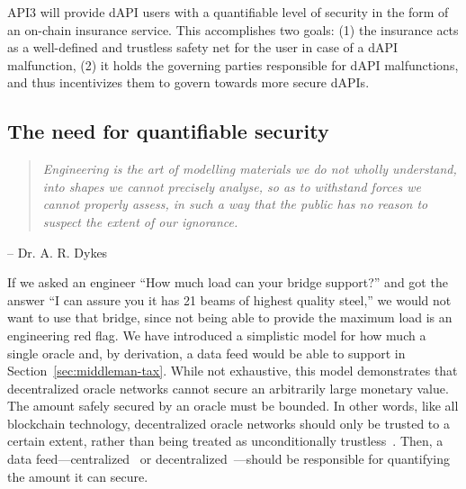 \documentclass[11pt]{article}
\begin{document}
API3 will provide dAPI users with a quantifiable level of security in the form of an on-chain insurance service.
This accomplishes two goals: (1) the insurance acts as a well-defined and trustless safety net for the user in case of a dAPI malfunction, (2) it holds the governing parties responsible for dAPI malfunctions, and thus incentivizes them to govern towards more secure dAPIs.

\subsection{The need for quantifiable security}
\label{sec:the-need-for-quantifiable-security}

\begin{quote}
\it
    Engineering is the art of modelling materials we do not wholly understand, into shapes we cannot precisely analyse, so as to withstand forces we cannot properly assess, in such a way that the public has no reason to suspect the extent of our ignorance.
\end{quote}
\begin{flushright}
-- Dr. A. R. Dykes
\end{flushright}

If we asked an engineer ``How much load can your bridge support?'' and got the answer ``I can assure you it has 21 beams of highest quality steel,'' we would not want to use that bridge, since not being able to provide the maximum load is an engineering red flag.
We have introduced a simplistic model for how much a single oracle and, by derivation, a data feed would be able to support in Section~\ref{sec:middleman-tax}.
While not exhaustive, this model demonstrates that decentralized oracle networks cannot secure an arbitrarily large monetary value.
The amount safely secured by an oracle must be bounded.
In other words, like all blockchain technology, decentralized oracle networks should only be trusted to a certain extent, rather than being treated as unconditionally trustless~\cite{defilippi:2020}.
Then, a data feed---centralized~\cite{coinbase} or decentralized~\cite{ellis:2017}---should be responsible for quantifying the amount it can secure.
\end{document}
